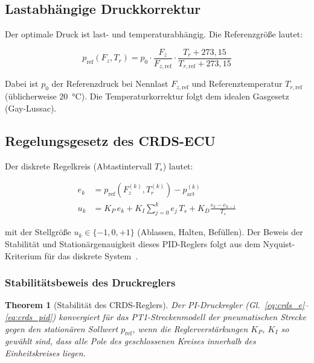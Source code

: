 ﻿\documentclass[12pt,a4paper]{article}
\newtheorem{theorem}{Theorem}[section]
\theoremstyle{definition}
\theoremstyle{remark}
\newcommand{\pref}{p_{\mathrm{ref}}}
\newcommand{\pact}{p_{\mathrm{act}}}
\newcommand{\Fz}{F_z}
\begin{document}
\subsection{Lastabhängige Druckkorrektur}

Der optimale Druck ist last- und temperaturabhängig. Die Referenzgröße lautet:

\begin{equation}
  \pref(\Fz, T_r) = p_0 \cdot \frac{\Fz}{F_{z,\mathrm{ref}}} \cdot
    \frac{T_r + 273{,}15}{T_{r,\mathrm{ref}} + 273{,}15}
  \label{eq:pref_adapt}
\end{equation}

Dabei ist $p_0$ der Referenzdruck bei Nennlast $F_{z,\mathrm{ref}}$ und
Referenztemperatur $T_{r,\mathrm{ref}}$ (üblicherweise \SI{20}{\celsius}).
Die Temperaturkorrektur folgt dem idealen Gasgesetz (Gay-Lussac).

\subsection{Regelungsgesetz des CRDS-ECU}

Der diskrete Regelkreis (Abtastintervall $T_s$) lautet:

\begin{align}
  e_k &= \pref\!\left(\Fz^{(k)}, T_r^{(k)}\right) - \pact^{(k)} \label{eq:crds_e}\\
  u_k &= K_P \, e_k + K_I \sum_{j=0}^{k} e_j \, T_s + K_D \frac{e_k - e_{k-1}}{T_s}
       \label{eq:crds_pid}
\end{align}

mit der Stellgröße $u_k \in \{-1, 0, +1\}$ (Ablassen, Halten, Befüllen).
Der Beweis der Stabilität und Stationärgenauigkeit dieses PID-Reglers
folgt aus dem Nyquist-Kriterium für das diskrete System~\cite{Astrom1997}.

\subsubsection{Stabilitätsbeweis des Druckreglers}

\begin{theorem}[Stabilität des CRDS-Reglers]
\label{thm:crds_stability}
Der PI-Druckregler (Gl.~\eqref{eq:crds_e}--\eqref{eq:crds_pid}) konvergiert
für das PT1-Streckenmodell der pneumatischen Strecke gegen den stationären
Sollwert $\pref$, wenn die Reglerverstärkungen $K_P$, $K_I$ so gewählt sind,
dass alle Pole des geschlossenen Kreises innerhalb des Einheitskreises liegen.
\end{theorem}
\end{document}
